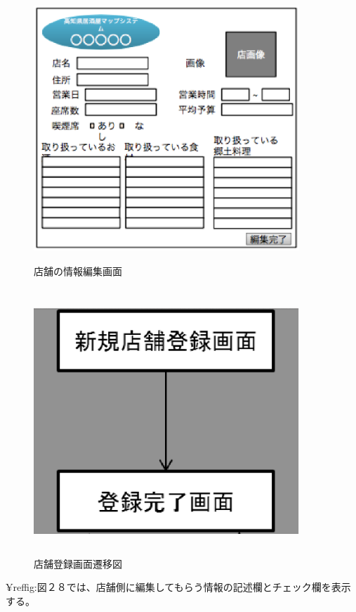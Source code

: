 \documentclass[a4j,titlepage]{jarticle}
\begin{document}
\begin {figure}[!htbp]
    \begin{center}
    \includegraphics [height=10cm, width=10cm]{28.eps}
    \caption {店舗の情報編集画面}
    \label {fig:28}
    \end{center}
\end {figure}



\begin {figure}[!htbp]
    \begin{center}
    \includegraphics [height=10cm, width=10cm]{29.eps}
    \caption {店舗登録画面遷移図}
    \label {fig:29}
    \end{center}
\end {figure}
\clearpage
¥ref{fig:図２８}では、店舗側に編集してもらう情報の記述欄とチェック欄を表示する。
\end{document}
